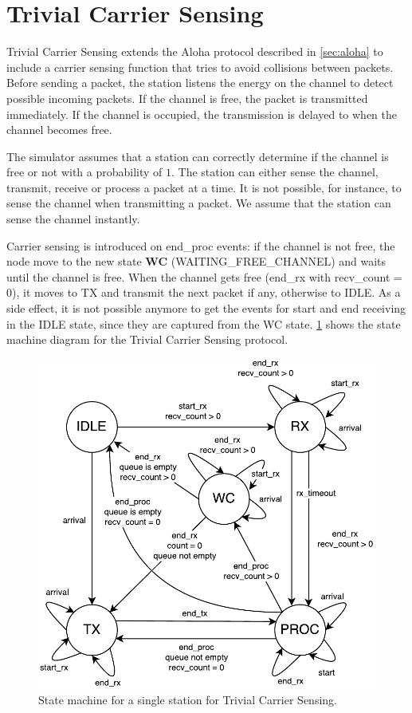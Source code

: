 \section{Trivial Carrier Sensing}
\label{sec:trivial}

Trivial Carrier Sensing extends the Aloha protocol described in \cref{sec:aloha} to include a carrier sensing function that tries to avoid collisions between packets.
Before sending a packet, the station listens the energy on the channel to detect possible incoming packets.
If the channel is free, the packet is transmitted immediately.
If the channel is occupied, the transmission is delayed to when the channel becomes free.

The simulator assumes that a station can correctly determine if the channel is free or not with a probability of $1$.
The station can either sense the channel, transmit, receive or process a packet at a time.
It is not possible, for instance, to sense the channel when transmitting a packet.
We assume that the station can sense the channel instantly.

Carrier sensing is introduced on end\_proc events: if the channel is not free, the node move to the new state \textbf{WC} (WAITING\_FREE\_CHANNEL) and waits until the channel is free.
When the channel gets free (end\_rx with recv\_count = 0), it moves to TX and transmit the next packet if any, otherwise to IDLE.
As a side effect, it is not possible anymore to get the events for start and end receiving in the IDLE state, since they are captured from the WC state.
\cref{fig:trivial_cs_states} shows the state machine diagram for the Trivial Carrier Sensing protocol.

\begin{figure}[h]
	\centering
	\includegraphics[width=0.95\columnwidth]{figures/states/trivial}
	\caption{State machine for a single station for Trivial Carrier Sensing.}
	\label{fig:trivial_cs_states}
\end{figure}
